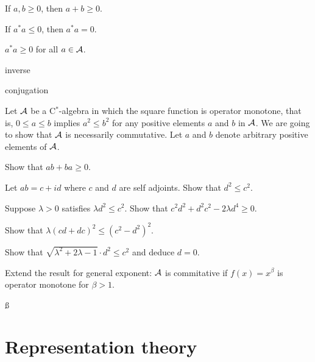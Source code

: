 \documentclass{../note}
\begin{document}
\begin{prb}

\begin{parts}
\item If $a,b\ge0$, then $a+b\ge0$.
\item If $a^*a\le0$, then $a^*a=0$.
\item $a^*a\ge0$ for all $a\in\mathcal{A}$.
\end{parts}
\end{prb}


\begin{prb}
\begin{parts}
\item inverse
\item conjugation
\end{parts}
\end{prb}



\begin{prb}
Let $\mathcal{A}$ be a C$^*$-algebra in which the square function is operator monotone, that is, $0\le a\le b$ implies $a^2\le b^2$ for any positive elements $a$ and $b$ in $\mathcal{A}$.
We are going to show that $\mathcal{A}$ is necessarily commutative.
Let $a$ and $b$ denote arbitrary positive elements of $\mathcal{A}$.
\begin{parts}
\item
Show that $ab+ba\ge0$.
\item
Let $ab=c+id$ where $c$ and $d$ are self adjoints.
Show that $d^2\le c^2$.
\item
Suppose $\lambda>0$ satisfies $\lambda d^2\le c^2$.
Show that $c^2d^2+d^2c^2-2\lambda d^4\ge0$.
\item
Show that $\lambda(cd+dc)^2\le(c^2-d^2)^2$.
\item
Show that $\sqrt{\lambda^2+2\lambda-1}\cdot d^2\le c^2$ and deduce $d=0$.
\item
Extend the result for general exponent: $\mathcal{A}$ is commitative if $f(x)=x^\beta$ is operator monotone for $\beta>1$.
\end{parts}
\end{prb}


\begin{prb}ß
\end{prb}


\section{Representation theory}
\end{document}
